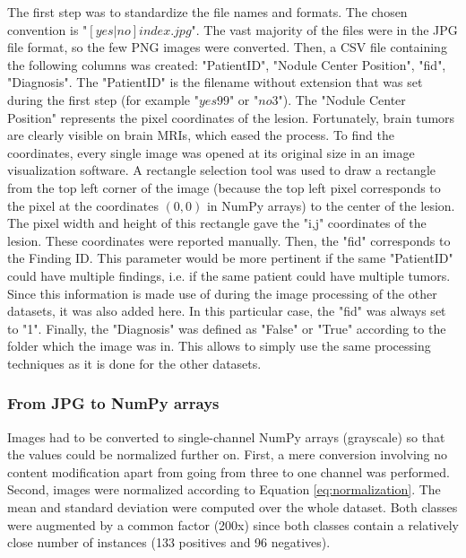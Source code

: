 The first step was to standardize the file names and formats. The chosen convention is "$[yes|no]{index}.jpg$". The vast majority of the files were in the JPG file format, so the few PNG images were converted. Then, a CSV file containing the following columns was created: "PatientID", "Nodule Center Position", "fid", "Diagnosis". The "PatientID" is the filename without extension that was set during the first step (for example "$yes99$" or "$no3$"). The "Nodule Center Position" represents the pixel coordinates of the lesion. Fortunately, brain tumors are clearly visible on brain MRIs, which eased the process. To find the coordinates, every single image was opened at its original size in an image visualization software. A rectangle selection tool was used to draw a rectangle from the top left corner of the image (because the top left pixel corresponds to the pixel at the coordinates $(0,0)$ in NumPy arrays) to the center of the lesion. The pixel width and height of this rectangle gave the "i,j" coordinates of the lesion. These coordinates were reported manually. Then, the "fid" corresponds to the Finding ID. This parameter would be more pertinent if the same "PatientID" could have multiple findings, i.e. if the same patient could have multiple tumors. Since this information is made use of during the image processing of the other datasets, it was also added here. In this particular case, the "fid" was always set to "1". Finally, the "Diagnosis" was defined as "False" or "True" according to the folder which the image was in. This allows to simply use the same processing techniques as it is done for the other datasets.


\subsubsection{From JPG to NumPy arrays}
\setlength{\marginparwidth}{3cm}\leavevmode {}Images had to be converted to single-channel NumPy arrays (grayscale) so that the values could be normalized further on. First, a mere conversion involving no content modification apart from going from three to one channel was performed. Second, images were normalized according to Equation \ref{eq:normalization}. The mean and standard deviation were computed over the whole dataset. Both classes were augmented by a common factor (200x) since both classes contain a relatively close number of instances (133 positives and 96 negatives).

